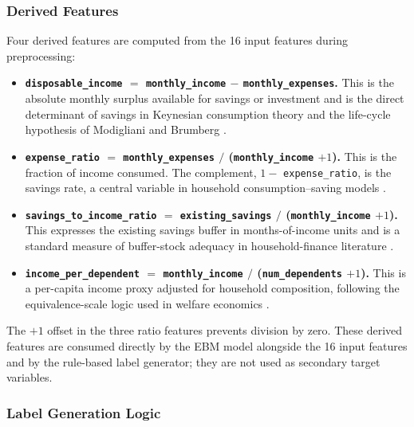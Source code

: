 \documentclass[journal]{./IEEE/IEEEtran}
\begin{document}
\subsubsection{Derived Features}

Four derived features are computed from the 16 input features during preprocessing:

\begin{itemize}
    \item \textbf{\texttt{disposable\_income} $=$ \texttt{monthly\_income} $-$ \texttt{monthly\_expenses}.} This is the absolute monthly surplus available for savings or investment and is the direct determinant of savings in Keynesian consumption theory and the life-cycle hypothesis of Modigliani and Brumberg \cite{ref65}.
    \item \textbf{\texttt{expense\_ratio} $=$ \texttt{monthly\_expenses} $/$ (\texttt{monthly\_income} $+ 1$).} This is the fraction of income consumed. The complement, $1 -$ \texttt{expense\_ratio}, is the savings rate, a central variable in household consumption--saving models \cite{ref55}.
    \item \textbf{\texttt{savings\_to\_income\_ratio} $=$ \texttt{existing\_savings} $/$ (\texttt{monthly\_income} $+ 1$).} This expresses the existing savings buffer in months-of-income units and is a standard measure of buffer-stock adequacy in household-finance literature \cite{ref55}.
    \item \textbf{\texttt{income\_per\_dependent} $=$ \texttt{monthly\_income} $/$ (\texttt{num\_dependents} $+ 1$).} This is a per-capita income proxy adjusted for household composition, following the equivalence-scale logic used in welfare economics \cite{ref55}.
\end{itemize}

The $+1$ offset in the three ratio features prevents division by zero. These derived features are consumed directly by the EBM model alongside the 16 input features and by the rule-based label generator; they are not used as secondary target variables.

\subsubsection{Label Generation Logic}
\label{sec:label-gen}
\end{document}
